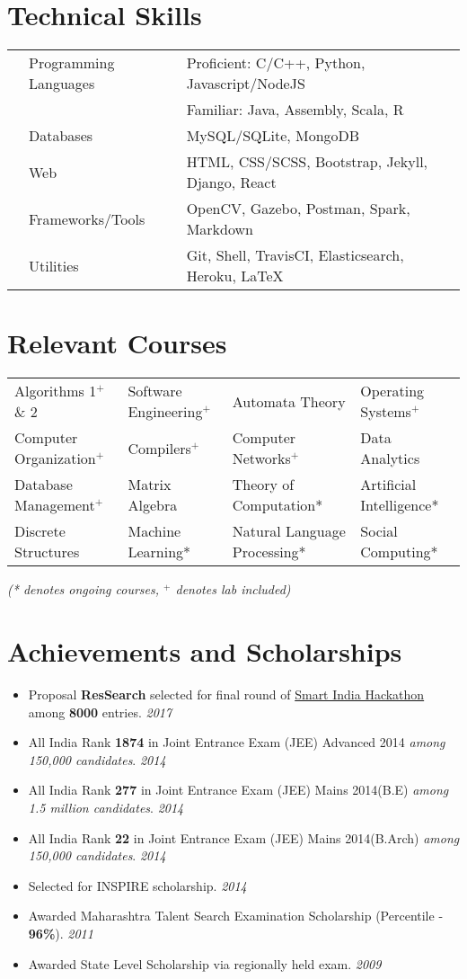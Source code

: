 \documentclass[10pt,a4paper]{moderncv}
\newcommand{\newlink}[2]{
  \href{#1}{\color{blue}#2}
}
\newcommand{\achieve}[2]{
  \item #1 \hfill \textit{#2}
}
\begin{document}
\section*{Technical Skills}
\begin{tabular}{L{0.05cm} L{5cm} l}
  &Programming Languages      &Proficient: C/C++, Python, Javascript/NodeJS\\
  &                           &Familiar: Java, Assembly, Scala, R \\
  &Databases				   &MySQL/SQLite, MongoDB\\
  &Web			               &HTML, CSS/SCSS, Bootstrap, Jekyll, Django, React\\
  &Frameworks/Tools			   &OpenCV, Gazebo, Postman, Spark, Markdown\\
  &Utilities                   &Git, Shell, TravisCI, Elasticsearch, Heroku, \LaTeX\\
\end{tabular}

\section*{Relevant Courses}
\begin{tabular}{p{5.2cm} p{5.2cm} p{5.2cm} p{5.2cm}}
  Algorithms 1$^+$ \& 2 & Software Engineering$^+$ & Automata Theory & Operating Systems$^+$\\
  Computer Organization$^+$ & Compilers$^+$ & Computer Networks$^+$ & Data Analytics\\
  Database Management$^+$ & Matrix Algebra & Theory of Computation* & Artificial Intelligence*\\
  Discrete Structures & Machine Learning* & Natural Language Processing* & Social Computing*\\
\end{tabular}
\footnotesize \textit{(* denotes ongoing courses, $^+$ denotes lab included)}

\vspace{-0.1cm}
\section*{Achievements and Scholarships}
\begin{itemize}
  \setlength\itemsep{0.5em}
  \achieve{Proposal \textbf{ResSearch} selected for final round of\newlink{https://drive.google.com/open?id=0B5iU6cWw36rOamZLWHZENWdlY0k}{Smart India Hackathon} among \textbf{8000} entries.}{2017}
  \achieve{All India Rank \textbf{1874} in Joint Entrance Exam (JEE) Advanced 2014 \textit{among 150,000 candidates}.}{2014}
  \achieve{All India Rank \textbf{277} in Joint Entrance Exam (JEE) Mains 2014(B.E) \textit{among 1.5 million candidates}.}{2014}
  \achieve{All India Rank \textbf{22} in Joint Entrance Exam (JEE) Mains 2014(B.Arch) \textit{among 150,000 candidates}.}{2014}
  \achieve{Selected for INSPIRE scholarship.}{2014}
  \achieve{Awarded Maharashtra Talent Search Examination Scholarship (Percentile - \textbf{96\%}).}{2011}
  \achieve{Awarded State Level Scholarship via regionally held exam.}{2009}

\end{itemize}
\end{document}
